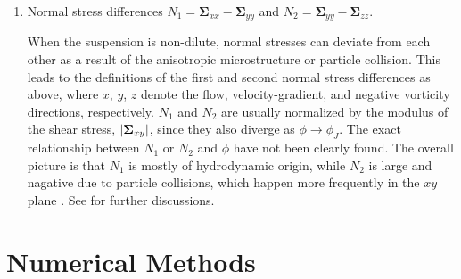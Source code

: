 \begin{enumerate}
\item Normal stress differences $N_1=\bm{\Sigma}_{xx}-\bm{\Sigma}_{yy}$ and $N_2=\bm{\Sigma}_{yy}-\bm{\Sigma}_{zz}$.

\medskip
When the suspension is non-dilute, normal stresses can deviate from each other as a result of the anisotropic microstructure or particle collision.
This leads to the definitions of the first and second normal stress differences as above, where $x$, $y$, $z$ denote the flow, velocity-gradient, and negative vorticity directions, respectively.
$N_1$ and $N_2$ are usually normalized by the modulus of the shear stress, $\lvert\bm{\Sigma}_{xy}\rvert$, since they also diverge as $\phi \to \phi_J$.
The exact relationship between $N_1$ or $N_2$ and $\phi$ have not been clearly found. The overall picture is that $N_1$ is mostly of hydrodynamic origin, while $N_2$ is large and nagative due to particle collisions, which happen more frequently in the $xy$ plane \citep{guazzelli_pouliquen_2018}.
See \cite{seto_giusteri_2018} for further discussions.

\end{enumerate}




\chapter{Numerical Methods}



